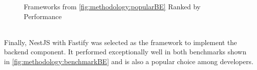 \clearpage
\begin{figure}[htbp] \ContinuedFloat
  \myfloatalign
   \caption{Frameworks from \autoref{fig:methodology:popularBE} Ranked by Performance}
   \label{fig:methodology:benchmarkBE}
\end{figure}
~\\
Finally, NestJS \cite{methodology:nestjs} with Fastify was selected as the framework to implement the backend component. It performed exceptionally well in both benchmarks shown in \autoref{fig:methodology:benchmarkBE} and is also a popular choice among developers.
